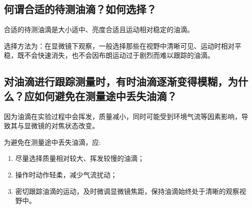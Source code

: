 \documentclass[]{../template/Report}%
\begin{document}
\begin{fullreportonly}
\subsection{何谓合适的待测油滴？如何选择？}
合适的待测油滴是大小适中、亮度合适且运动相对稳定的油滴。

\vspace{2mm}
选择方法为：在显微镜下观察，一般选择那些在视野中清晰可见、运动时相对平稳，既不会快速消失，也不会因布朗运动过于剧烈而难以跟踪的油滴。
\subsection{对油滴进行跟踪测量时，有时油滴逐渐变得模糊，为什么？应如何避免在测量途中丢失油滴？}
因为油滴在实验过程中会挥发，质量减小，同时可能受到环境气流等因素影响，导致其与显微镜的对焦状态改变。

\vspace{2mm}
为避免在测量途中丢失油滴，应:
\begin{enumerate}
    \item 尽量选择质量相对较大、挥发较慢的油滴；
    \item 操作时动作轻柔，减少气流扰动；
    \item 密切跟踪油滴的运动，及时微调显微镜焦距，保持油滴始终处于清晰的观察视野中。
\end{enumerate}
\end{fullreportonly}
\insertnotes
\end{document}
